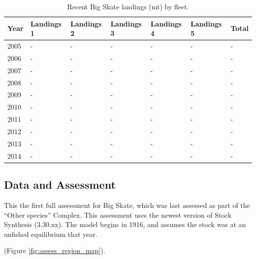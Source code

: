 \documentclass[12pt,]{article}
\begin{document}
\begin{table}[ht]
\centering
\caption{Recent Big Skate landings (mt) by 
                                            fleet.} 
\label{tab:Exec_catch}
\begin{tabular}{l>{\centering}p{1in}>{\centering}p{1in}>{\centering}p{1in}>{\centering}p{.9in}>{\centering}p{.9in}>{\centering}p{.6in}}
  \hline
Year & Landings 1 & Landings 2 & Landings 3 & Landings 4 & Landings 5 & Total \\ 
  \hline
2005 & - & - & - & - & - & - \\ 
  2006 & - & - & - & - & - & - \\ 
  2007 & - & - & - & - & - & - \\ 
  2008 & - & - & - & - & - & - \\ 
  2009 & - & - & - & - & - & - \\ 
  2010 & - & - & - & - & - & - \\ 
  2011 & - & - & - & - & - & - \\ 
  2012 & - & - & - & - & - & - \\ 
  2013 & - & - & - & - & - & - \\ 
  2014 & - & - & - & - & - & - \\ 
   \hline
\end{tabular}
\end{table}

\FloatBarrier

\newpage

\hypertarget{data-and-assessment}{%
\subsection*{Data and Assessment}\label{data-and-assessment}}

This the first full assessment for Big Skate, which was last assessed as
part of the ``Other species'' Complex. This assessment uses the newest
version of Stock Synthesis (3.30.xx). The model begins in 1916, and
assumes the stock was at an unfished equilibrium that year.

(Figure \ref{fig:assess_region_map}).
\end{document}
